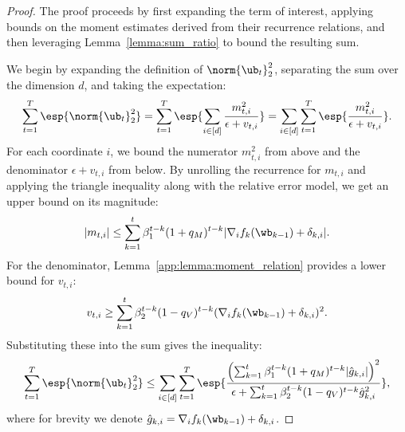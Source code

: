 \documentclass[11pt, letterpaper]{article}
\begin{document}
\begin{proof}
The proof proceeds by first expanding the term of interest, applying bounds on the moment estimates derived from their recurrence relations, and then leveraging Lemma~\ref{lemma:sum_ratio} to bound the resulting sum.

We begin by expanding the definition of $\norm{\ub_t}_2^2$, separating the sum over the dimension $d$, and taking the expectation:
\begin{align}
    \sum_{t=1}^T\esp{\norm{\ub_t}^2_2} = \sum_{t=1}^T\esp{\sum_{i\in [d]}\frac{m^2_{t,i}}{\epsilon+v_{t,i}}} = \sum_{i\in [d]}\sum_{t=1}^T\esp{\frac{m^2_{t,i}}{\epsilon+v_{t,i}}}.
\end{align}
For each coordinate $i$, we bound the numerator $m_{t,i}^2$ from above and the denominator $\epsilon+v_{t,i}$ from below. By unrolling the recurrence for $m_{t,i}$ and applying the triangle inequality along with the relative error model, we get an upper bound on its magnitude:
\begin{align}
    |m_{t, i}| \le \sum_{k=1}^t\beta_1^{t-k}(1+q_M)^{t-k}|\nabla_i f_k(\wb_{k-1}) + \delta_{k,i}|.
\end{align}
For the denominator, Lemma~\ref{app:lemma:moment_relation} provides a lower bound for $v_{t,i}$:
\begin{align}
    v_{t,i} \ge \sum_{k=1}^t\beta_2^{t-k}(1-q_V)^{t-k}(\nabla_i f_k(\wb_{k-1}) + \delta_{k,i})^2.
\end{align}
Substituting these into the sum gives the inequality:
\begin{align}
 \label{eq:u_bound_intermediate_lemma10}
 \sum_{t=1}^T\esp{\norm{\ub_t}^2_2} \le \sum_{i\in [d]}\sum_{t=1}^T\esp{\frac{\left(\sum_{k=1}^t\beta_1^{t-k}(1+q_M)^{t-k}|\hat{g}_{k,i}|\right)^2}{\epsilon+\sum_{k=1}^t\beta_2^{t-k}(1-q_V)^{t-k}\hat{g}_{k,i}^2}},
\end{align}
where for brevity we denote $\hat{g}_{k,i} = \nabla_i f_k(\wb_{k-1}) + \delta_{k,i}$.


\end{proof}
\end{document}
